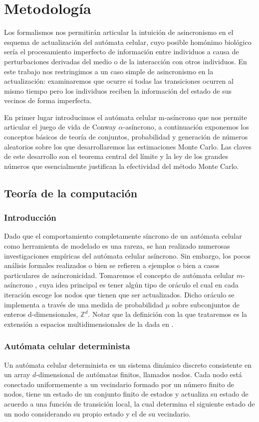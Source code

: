 \documentclass[../proyecto.tex]{memoir}
\begin{document}
\chapter{Metodología}

Los formalismos nos permitirán articular la intuición de asincronismo en el esquema de actualización del autómata celular, cuyo posible homónimo biológico sería el procesamiento imperfecto de información entre individuos a causa de perturbaciones derivadas del medio o de la interacción con otros individuos. En este trabajo nos restringimos a un caso simple de asincronismo en la actualización: examinaremos que ocurre si todas las transiciones ocurren al mismo tiempo pero los individuos reciben la información del estado de sus vecinos de forma imperfecta.

En primer lugar introducimos el autómata celular m-asíncrono que nos permite articular el juego de vida de Conway $\alpha$-asíncrono, a continuación exponemos los conceptos básicos de teoría de conjuntos, probabilidad y generación de números aleatorios sobre los que desarrollaremos las estimaciones Monte Carlo. Las claves de este desarrollo son el teorema central del límite y la ley de los grandes números que esencialmente justifican la efectividad del método Monte Carlo.
 
\section{Teoría de la computación}

\subsection{Introducción}
Dado que el comportamiento completamente síncrono de un autómata celular como herramienta de modelado es una rareza, se han realizado numerosas investigaciones empíricas del autómata celular asíncrono. Sin embargo, los pocos análisis formales realizados o bien se refieren a ejemplos o bien a casos particulares de asíncronicidad. Tomaremos el concepto de autómata celular $m$-asíncrono \cite{oraculo}, cuya idea principal es tener algún tipo de oráculo el cual en cada iteración escoge los nodos que tienen que ser actualizados. Dicho oráculo se implementa a través de una medida de probabilidad $\mu$ sobre subconjuntos de enteros d-dimensionales, $\mathds{Z}^{d}$. Notar que la definición con la que trataremos es la extensión a espacios multidimensionales de la dada en \cite{oraculo}.

\subsection{Autómata celular determinista}
Un autómata celular determinista es un sistema dinámico discreto consistente en un array $d$-dimensional de autómatas finitos, llamados nodos. Cada nodo está conectado uniformemente a un vecindario formado por un número finito de nodos, tiene un estado de un conjunto finito de estados y actualiza su estado de acuerdo a una función de transición local, la cual determina el siguiente estado de un nodo considerando su propio estado y el de su vecindario. 
\end{document}
